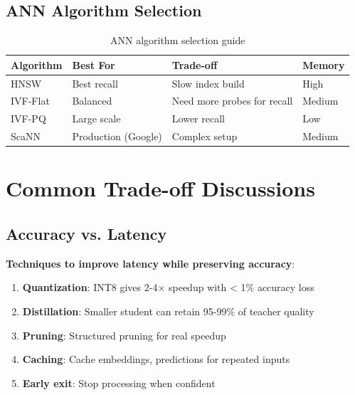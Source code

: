 \subsection{ANN Algorithm Selection}

\begin{table}[H]
\centering
\caption{ANN algorithm selection guide}
\begin{tabularx}{\textwidth}{lXXX}
\toprule
\textbf{Algorithm} & \textbf{Best For} & \textbf{Trade-off} & \textbf{Memory} \\
\midrule
HNSW & Best recall & Slow index build & High \\
IVF-Flat & Balanced & Need more probes for recall & Medium \\
IVF-PQ & Large scale & Lower recall & Low \\
ScaNN & Production (Google) & Complex setup & Medium \\
\bottomrule
\end{tabularx}
\end{table}

\section{Common Trade-off Discussions}
\label{sec:tradeoffs}

\subsection{Accuracy vs. Latency}

\textbf{Techniques to improve latency while preserving accuracy}:
\begin{enumerate}
    \item \textbf{Quantization}: INT8 gives 2-4× speedup with < 1\% accuracy loss
    \item \textbf{Distillation}: Smaller student can retain 95-99\% of teacher quality
    \item \textbf{Pruning}: Structured pruning for real speedup
    \item \textbf{Caching}: Cache embeddings, predictions for repeated inputs
    \item \textbf{Early exit}: Stop processing when confident
\end{enumerate}

